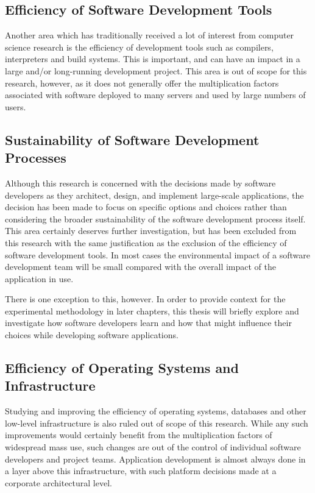 \subsection{Efficiency of Software Development Tools}

Another area which has traditionally received a lot of interest from computer science research  is the efficiency of development tools such as compilers, interpreters and build systems. This is important, and can have an impact in a large and/or long-running development project. This area is out of scope for this research, however, as it does not generally offer the multiplication factors associated with software deployed to many servers and used by large numbers of users.

\subsection{Sustainability of Software Development Processes}

Although this research is concerned with the decisions made by software developers as they architect, design, and implement large-scale applications, the decision has been made to focus on specific options and choices rather than considering the broader sustainability of the software development process itself. This area certainly deserves further investigation, but has been excluded from this research with the same justification as the exclusion of the efficiency of software development tools. In most cases the environmental impact of a software development team will be small compared with the overall impact of the application in use.  

There is one exception to this, however. In order to provide context for the experimental methodology in later chapters, this thesis will briefly explore and investigate how software developers learn and how that might influence their choices while developing software applications.

\subsection{Efficiency of Operating Systems and Infrastructure}

Studying and improving the efficiency of operating systems, databases and other low-level infrastructure is also ruled out of scope of this research. While any such improvements would certainly benefit from the multiplication factors of widespread mass use, such changes are out of the control of individual software developers and project teams. Application development is almost always done in a layer above this infrastructure, with such platform decisions made at a corporate architectural level.

